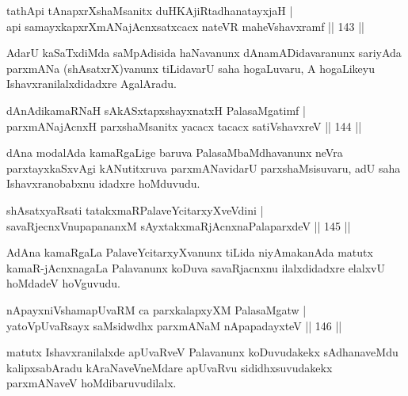 \begin{shl}
tathA\s pi tAnapxrXshaMsanitx duHKAjiRtadhanatayxjaH |\\
api samayxkapxrXmANajAcnxsatxcacx nateVR maheVshavxramf \hfill || 143 ||
\end{shl}

\begin{artha}%
AdarU kaSaTxdiMda saMpAdisida haNavanunx dAnamADidavaranunx sariyAda parxmANa (shAsatxrX)vanunx tiLidavarU saha hogaLuvaru, A hogaLikeyu Ishavxranilalxdidadxre AgalAradu.
\end{artha}

\begin{shl}
dAnAdikamaRNaH sAkASxtapxshayxnatxH PalasaMgatimf |\\
parxmANajAcnxH parxshaMsanitx yacacx tacacx satiVshavxreV \hfill || 144 ||
\end{shl}

\begin{artha}
dAna modalAda kamaRgaLige baruva PalasaMbaMdhavanunx neVra parxtayxkaSxvAgi kANutitxruva parxmANavidarU parxshaMsisuvaru, adU saha Ishavxranobabxnu idadxre hoMduvudu.
\end{artha}

\begin{shl}
shAsatxyaRsati tatakxmaRPalaveYcitarxyXveVdini |\\
savaRjecnxV\s nupapananxM sAyxtakxmaRjAcnxnaPalaparxdeV \hfill || 145 ||
\end{shl}

\begin{artha}
AdAna kamaRgaLa PalaveYcitarxyXvanunx tiLida niyAmakanAda matutx kamaR-\-jAcnxnagaLa Palavanunx koDuva savaRjacnxnu ilalxdidadxre elalxvU hoMdadeV hoVgu\-vudu.
\end{artha}


\begin{shl}
nApayxniVshamapUvaRM ca parxkalapxyXM PalasaMgatw |\\
yatoV\s pUvaRsayx saMsidwdhx parxmANaM nApapadayxteV \hfill || 146 ||
\end{shl}

\begin{artha}
matutx Ishavxranilalxde apUvaRveV Palavanunx koDuvudakekx sAdhanaveMdu kalipxsa\-bAradu kAraNaveVneMdare apUvaRvu sididhxsuvudakekx parxmANaveV hoMdi\-baruvudilalx.
\end{artha}

